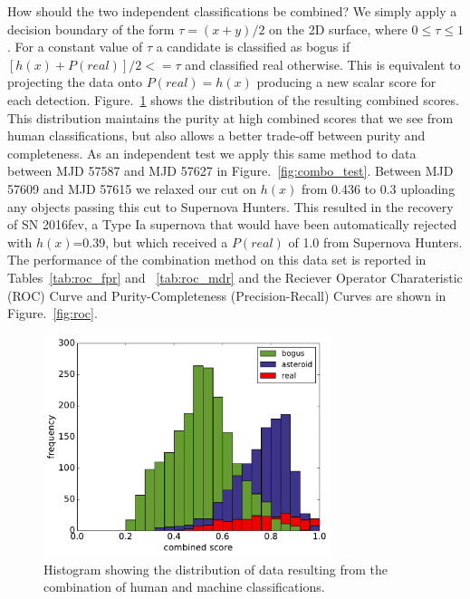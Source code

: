 \message{ !name(blank.tex)}\documentclass[a4paper,fleqn,usenatbib]{mnras}
\begin{document}

How should the two independent classifications be combined?  We simply apply a decision boundary of the form $\tau = (x + y)/2$ on the 2D surface, where $0\leq\tau\leq1$.  For a constant value of $\tau$ a candidate is classified as bogus if $[h(x)+P(real)]/2 <= \tau$ and classified real otherwise.  This is equivalent to projecting the data onto $P(real)=h(x)$ producing a new scalar score for each detection.  Figure.~\ref{fig:combo_hist} shows the distribution of the resulting combined scores.  This distribution maintains the purity at high combined scores that we see from human classifications, but also allows a better trade-off between purity and completeness.  As an independent test we apply this same method to data between MJD 57587 and MJD 57627 in
Figure.~\ref{fig:combo_test}.  Between MJD 57609 and MJD 57615 we relaxed our cut on $h(x)$ from 0.436 to 0.3 uploading any objects passing this cut to Supernova Hunters.  This resulted in the recovery of SN 2016fev, a Type Ia supernova that would have been automatically rejected with $h(x)$=0.39, but which received a $P(real)$ of 1.0 from Supernova Hunters.  The performance of the combination method on this data set is reported in Tables~\ref{tab:roc_fpr} and ~\ref{tab:roc_mdr} and the Reciever Operator Charateristic (ROC) Curve and Purity-Completeness (Precision-Recall) Curves are shown in Figure.~\ref{fig:roc}.

\begin{figure}
   \includegraphics[width=84mm]{figs/combo_hist.pdf}
   \caption{Histogram showing the distribution of data resulting from the combination of human and machine classifications.}
   \label{fig:combo_hist} 
\end{figure}
\end{document}
